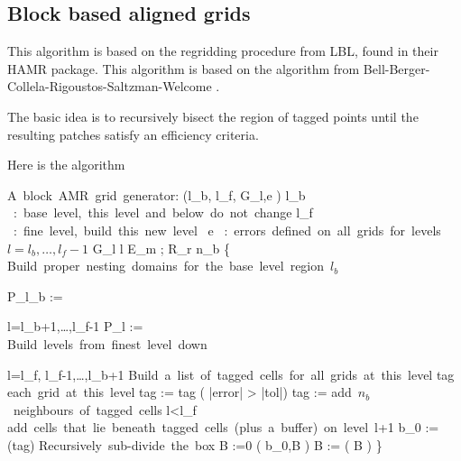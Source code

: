 \subsection{Block based aligned grids}

This algorithm is based on the regridding procedure from LBL, found 
in their HAMR package. This algorithm is based on the algorithm
from Bell-Berger-Collela-Rigoustos-Saltzman-Welcome
\cite{Berger3,bergerColella:1989,bergerRigoutsos:1991,bellBergerSaltzmanWelcome:1993}.

The basic idea is to recursively bisect the region of tagged points
until the resulting patches satisfy an efficiency criteria.

Here is the algorithm
\begin{algorithm}
\begin{programbox}
\mbox{A block AMR grid generator:}
(l_b, l_f, G_l,e )
l_b \mbox{ : base level, this level and below do not change}
l_f \mbox{ : fine level, build this new level }
e  \mbox{ : errors defined on all grids for levels $l=l_b,\ldots,l_f-1$}
G_l  l
 
E_m ;
R_r 
n_b 
\{\qtab
   \mbox{Build proper nesting domains for the base level region $l_b$}
  
  P_{l_b} :=   ~~

  \FOR l=l_b+1,\ldots,l_f-1
    P_l :=   ~~~
  \END
   \   \\
  \mbox{Build levels from finest level down}
  
  \FOR l=l_f, l_f-1,\ldots,l_b+1 
    \mbox{Build a list of tagged cells for all grids at this level}
    tag 
    \FOR \mbox{each grid at this level}
      tag := tag \cup ( |error| > |tol|)  
      tag := \mbox{add $n_b$ neighbours of tagged cells}
      \IF l<l_f \qquad{}
         \mbox{add cells that lie beneath tagged cells (plus a buffer) on level l+1}
      \END
    \END
    b_0 := (tag) 
    \mbox{Recursively sub-divide the box}
    B :=0 
    ( b_0,B ) 
    B := ( B ) 
  \END
\untab
\}
\end{programbox}
\end{algorithm}


